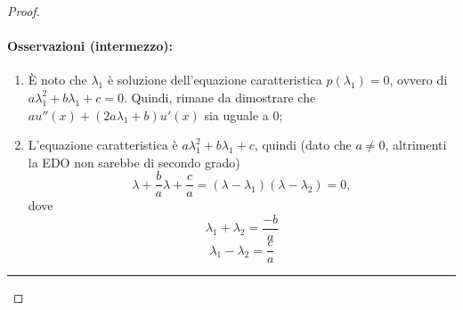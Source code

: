 \begin{proof}
\begin{enumerate}
		\paragraph{Osservazioni (intermezzo):}
		\begin{enumerate}
			\item È noto che $\lambda_1$ è soluzione dell'equazione caratteristica $p(\lambda_1)=0$, ovvero di $a\lambda_1^2+b\lambda_1 +c=0$. Quindi, rimane da dimostrare che $a u''(x)+(2a\lambda_1 + b)u'(x)$ sia uguale a 0;
			\item L'equazione caratteristica è $a\lambda_1^2+b\lambda_1 +c$, quindi (dato che $a\neq0$, altrimenti la EDO non sarebbe di secondo grado)
			\begin{equation*}
				\lambda + \frac{b}{a} \lambda + \frac{c}{a}= (\lambda - \lambda_1)(\lambda - \lambda_2) = 0,
			\end{equation*}
			dove
			\begin{equation}\label{eq:lambda1_+_lambda2}
				\lambda_1 + \lambda_2 = \frac{-b}{a}
			\end{equation}
			\begin{equation*}
				\lambda_1 - \lambda_2 = \frac{c}{a}
			\end{equation*}
		\end{enumerate}
		\hrule\vspace{2px}
	

\end{enumerate}
\end{proof}
